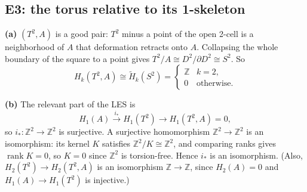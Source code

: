 \documentclass[11pt]{article}
\newcommand{\Z}{\mathbb Z}
\newcommand{\Hred}{\tilde H}
\begin{document}
\subsection*{E3: the torus relative to its 1-skeleton}

\textbf{(a)} $(T^2,A)$ is a good pair: $T^2$ minus a point of the open 2-cell is a neighborhood of $A$ that deformation retracts onto $A$. Collapsing the whole boundary of the square to a point gives $T^2/A\cong D^2/\partial D^2\cong S^2$. So
\[H_k(T^2,A)\cong\Hred_k(S^2)=\begin{cases}\Z&k=2,\\0&\text{otherwise.}\end{cases}\]

\textbf{(b)} The relevant part of the LES is
\[H_1(A)\xrightarrow{i_*}H_1(T^2)\to H_1(T^2,A)=0,\]
so $i_*:\Z^2\to\Z^2$ is surjective. A surjective homomorphism $\Z^2\to\Z^2$ is an isomorphism: its kernel $K$ satisfies $\Z^2/K\cong\Z^2$, and comparing ranks gives $\operatorname{rank}K=0$, so $K=0$ since $\Z^2$ is torsion-free. Hence $i_*$ is an isomorphism. (Also, $H_2(T^2)\to H_2(T^2,A)$ is an isomorphism $\Z\to\Z$, since $H_2(A)=0$ and $H_1(A)\to H_1(T^2)$ is injective.)
\end{document}
